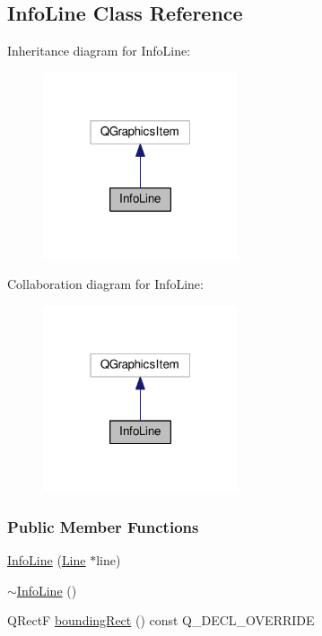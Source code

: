 \hypertarget{class_info_line}{}\subsection{Info\+Line Class Reference}
\label{class_info_line}


Inheritance diagram for Info\+Line\+:\nopagebreak
\begin{figure}[H]
\begin{center}
\leavevmode
\includegraphics[width=163pt]{class_info_line__inherit__graph}
\end{center}
\end{figure}


Collaboration diagram for Info\+Line\+:\nopagebreak
\begin{figure}[H]
\begin{center}
\leavevmode
\includegraphics[width=163pt]{class_info_line__coll__graph}
\end{center}
\end{figure}
\subsubsection*{Public Member Functions}
\begin{DoxyCompactItemize}
\item 
\hyperlink{class_info_line_a63819dbfeb257cc86be86f0fac3aa02f}{Info\+Line} (\hyperlink{class_line}{Line} $\ast$line)
\item 
\hyperlink{class_info_line_ac3497eeb5f2719fb4fac42434955597d}{$\sim$\+Info\+Line} ()
\item 
Q\+Rect\+F \hyperlink{class_info_line_a3103eee5d5a8b4fd53d428f9aea01830}{bounding\+Rect} () const Q\+\_\+\+D\+E\+C\+L\+\_\+\+O\+V\+E\+R\+R\+I\+D\+E
\end{DoxyCompactItemize}
